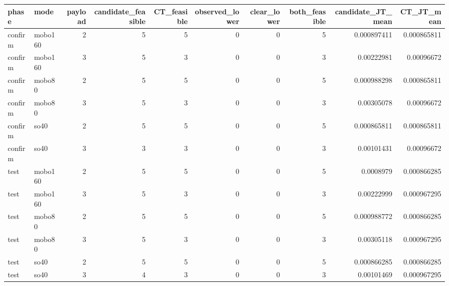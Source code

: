 \begin{tabular}{llrrrrrrrr}
\toprule
phase & mode & payload & candidate\_feasible & CT\_feasible & observed\_lower & clear\_lower & both\_feasible & candidate\_JT\_mean & CT\_JT\_mean \\
\midrule
confirm & mobo160 & 2 & 5 & 5 & 0 & 0 & 5 & 0.000897411 & 0.000865811 \\
confirm & mobo160 & 3 & 5 & 3 & 0 & 0 & 3 & 0.00222981 & 0.00096672 \\
confirm & mobo80 & 2 & 5 & 5 & 0 & 0 & 5 & 0.000988298 & 0.000865811 \\
confirm & mobo80 & 3 & 5 & 3 & 0 & 0 & 3 & 0.00305078 & 0.00096672 \\
confirm & so40 & 2 & 5 & 5 & 0 & 0 & 5 & 0.000865811 & 0.000865811 \\
confirm & so40 & 3 & 3 & 3 & 0 & 0 & 3 & 0.00101431 & 0.00096672 \\
test & mobo160 & 2 & 5 & 5 & 0 & 0 & 5 & 0.0008979 & 0.000866285 \\
test & mobo160 & 3 & 5 & 3 & 0 & 0 & 3 & 0.00222999 & 0.000967295 \\
test & mobo80 & 2 & 5 & 5 & 0 & 0 & 5 & 0.000988772 & 0.000866285 \\
test & mobo80 & 3 & 5 & 3 & 0 & 0 & 3 & 0.00305118 & 0.000967295 \\
test & so40 & 2 & 5 & 5 & 0 & 0 & 5 & 0.000866285 & 0.000866285 \\
test & so40 & 3 & 4 & 3 & 0 & 0 & 3 & 0.00101469 & 0.000967295 \\
\bottomrule
\end{tabular}
